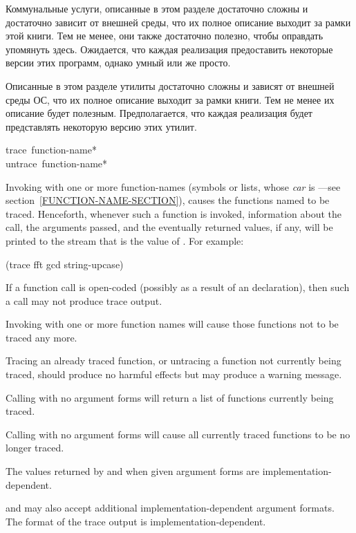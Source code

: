 Коммунальные услуги, описанные в этом разделе достаточно сложны
и достаточно зависит от внешней среды, что их
полное описание выходит за рамки этой книги.
Тем не менее, они также достаточно
полезно, чтобы оправдать упомянуть здесь. Ожидается, что
каждая реализация
предоставить некоторые версии этих программ, однако умный или же просто.

Описанные в этом разделе утилиты достаточно сложны и зависят от внешней среды
ОС, что их полное описание выходит за рамки книги. Тем не менее их описание
будет полезным. Предполагается, что каждая реализация будет представлять
некоторую версию этих утилит.

\begin{defmac}
trace {\,function-name}* \\
untrace {\,function-name}*

Invoking  with one or more function-names (symbols or lists, whose
\emph{car} is ---see section~\ref{FUNCTION-NAME-SECTION}),
 causes
the functions named to be traced.  Henceforth, whenever such
a function is invoked, information about the call, the arguments
passed, and the eventually returned values, if any, will be printed
to the stream that is the value of .
For example:
\begin{lisp}
(trace fft gcd string-upcase)
\end{lisp}
If a function call is open-coded (possibly as a result of an 
declaration), then such a call may not produce trace output.

Invoking  with one or more function names will cause those
functions not to be traced any more.

Tracing an already traced function, or untracing a function not
currently being traced, should produce no harmful effects but may
produce a warning message.

Calling  with no argument forms will return a list of functions
currently being traced.

Calling  with no argument forms will cause all currently
traced functions to be no longer traced.

The values returned by  and  when
given argument forms are implementation-dependent.

 and  may also accept additional
implementation-dependent argument formats.  The format of the trace
output is implementation-dependent.
\end{defmac}

